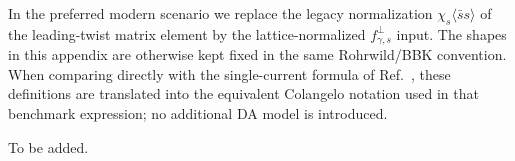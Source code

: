 \documentclass[aps,prd,preprint,nofootinbib,superscriptaddress]{revtex4-2}
\newcommand{\ssbar}{\langle\bar s s\rangle}
\begin{document}
In the preferred modern scenario we replace the legacy normalization
$\chi_s\ssbar$ of the leading-twist matrix element by the lattice-normalized
$f_{\gamma,s}^{\perp}$ input.  The shapes in this appendix are otherwise kept
fixed in the same Rohrwild/BBK convention.
When comparing directly with the single-current formula of
Ref.~\cite{Colangelo:2005hv}, these definitions are translated into the
equivalent Colangelo notation used in that benchmark expression; no additional
DA model is introduced.

\begin{acknowledgments}
To be added.
\end{acknowledgments}



\end{document}
